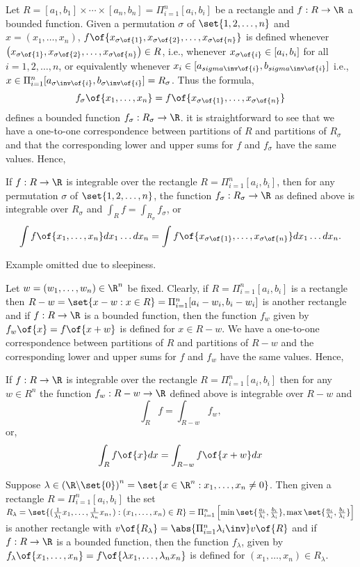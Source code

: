 Let $R = [a_1,b_1] \times \cdots \times [a_n, b_n] = \Pi_{i=1}^n [a_i,b_i]$ be a rectangle and $f: R \to \R$ a bounded function. Given a permutation $\sigma$ of $\set{1,2,\dots,n}$ and $x = (x_1,\dots,x_n)$, $f\of{x_{\sigma\of{1}}, x_{\sigma\of{2}}, \dots, x_{\sigma\of{n}}}$ is defined whenever $\left(x_{\sigma\of{1}}, x_{\sigma\of{2}}, \dots, x_{\sigma\of{n}}\right) \in R$, i.e., whenever $x_{\sigma\of{i}} \in [a_i,b_i]$ for all $i = 1, 2, \dots, n$, or equivalently whenever $x_i \in [a_{sigma\inv\of{i}}, b_{sigma\inv\of{i}}]$ i.e., $x \in \Pi_{i=1}^n [a_{\sigma\inv\of{i}}, b_{\sigma\inv\of{i}}] = R_\sigma$. Thus the formula,
\[f_\sigma\of{x_1, \dots, x_n} = f\of{x_{\sigma\of{1}}, \dots, x_{\sigma\of{n}}}\]
defines a bounded function $f_\sigma: R_\sigma \to \R$. it is straightforward to see that we have a one-to-one correspondence between partitions of $R$ and partitions of $R_\sigma$ and that the corresponding lower and upper sums for $f$ and $f_\sigma$ have the same values. Hence,

\begin{theorem}
    If $f: R \to \R$ is integrable over the rectangle $R = \Pi_{i=1}^n [a_i, b_i]$, then for any permutation $\sigma$ of $\set{1,2,\dots,n}$, the function $f_\sigma: R_\sigma \to \R$ as defined above is integrable over $R_\sigma$ and $\int_R f = \int_{R_\sigma} f_\sigma$, or
    \[\int f\of{x_1, \dots, x_n} dx_1 \dots dx_n = \int f\of{x_{\sigma\of{1}}, \dots, x_{\sigma\of{n}}} dx_1 \dots dx_n.\]
\end{theorem}

Example omitted due to sleepiness.

Let $w = \left(w_1, \dots, w_n\right) \in \R^n$ be fixed. Clearly, if $R = \Pi_{i=1}^n [a_i,b_i]$ is a rectangle then $R - w = \set{x - w: x \in R} = \Pi_{i=1}^n [a_i - w_i, b_i - w_i]$ is another rectangle and if $f: R \to \R$ is a bounded function, then the function $f_w$ given by $f_w\of{x} = f\of{x + w}$ is defined for $x \in R - w$. We have a one-to-one correspondence between partitions of $R$ and partitions of $R-w$ and the corresponding lower and upper sums for $f$ and $f_w$ have the same values. Hence,

\begin{theorem}
    If $f: R \to \R$ is integrable over the rectangle $R = \Pi_{i=1}^n [a_i,b_i]$ then for any $w \in R^n$ the function $f_w: R-w \to \R$ defined above is integrable over $R - w$ and \[\int_R f = \int_{R-w} f_w,\] or, \[\int_R f\of{x} dx = \int_{R-w} f\of{x+w} dx\]
\end{theorem}

Suppose $\lambda \in \left(\R \backslash \set{0}\right)^n = \set{x \in \R^n: x_1, \dots, x_n \neq 0}$. Then given a rectangle $R = \Pi_{i=1}^n [a_i,b_i]$ the set $R_\lambda = \set{(\frac{1}{\lambda_1}x_1,\dots,\frac{1}{\lambda_n}x_n,): (x_1, \dots, x_n) \in R} = \Pi_{i=1}^n \left[\min \set{\frac{a_i}{\lambda_i}, \frac{b_i}{\lambda_i}}, \max \set{\frac{a_i}{\lambda_i}, \frac{b_i}{\lambda_i}}\right]$ is another rectangle with $v\of{R_\lambda} = \abs{\Pi_{i=1}^n \lambda_i\inv}v\of{R}$ and if $f: R \to \R$ is a bounded function, then the function $f_\lambda$, given by $f_\lambda\of{x_1, \dots, x_n} = f\of{\lambda x_1, \dots, \lambda_n x_n}$ is defined for $(x_1, \dots, x_n) \in R_\lambda$.